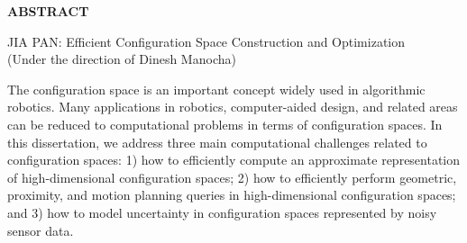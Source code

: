 \begin{center}
\vspace*{52pt}
{\Large \textbf{ABSTRACT}}
\vspace{11pt}
\begin{singlespace}
JIA PAN: Efficient Configuration Space Construction and Optimization\\
(Under the direction of Dinesh Manocha)
\end{singlespace}
\end{center}

The configuration space is an important concept widely used in algorithmic robotics. Many applications in robotics, computer-aided design, and related areas can be reduced to computational problems in terms of configuration spaces. In this dissertation, we address three main computational challenges related to configuration spaces: 1) how to efficiently compute an approximate representation of high-dimensional configuration spaces; 2) how to efficiently perform geometric, proximity, and motion planning queries in high-dimensional configuration spaces; and 3) how to model uncertainty in configuration spaces represented by noisy sensor data.



